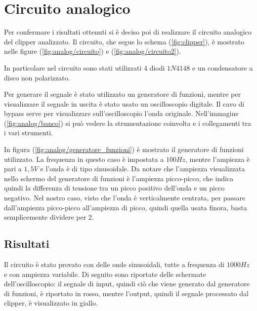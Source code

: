 \chapter{Circuito analogico}
	Per confermare i risultati ottenuti si è deciso poi di realizzare il circuito analogico del clipper analizzato. Il circuito, che segue lo schema (\ref{fig:clipper}), è mostrato nelle figure (\ref{fig:analog/circuito}) e (\ref{fig:analog/circuito2}).
	
	
	In particolare nel circuito sono stati utilizzati $4$ diodi $1N4148$ e un condensatore a disco non polarizzato.
	
	Per generare il segnale è stato utilizzato un generatore di funzioni, mentre per visualizzare il segnale in uscita è stato usato un oscilloscopio digitale. Il cavo di bypass serve per visualizzare sull'oscilloscopio l'onda originale. Nell'immagine (\ref{fig:analog/banco}) si può vedere la strumentazione coinvolta e i collegamenti tra i vari strumenti.
	
	In figura (\ref{fig:analog/generatore_funzioni}) è mostrato il generatore di funzioni utilizzato. La frequenza in questo caso è impostata a $100Hz$, mentre l'ampiezza è pari a $1,5V$ e l'onda è di tipo sinusoidale. Da notare che l'ampiezza visualizzata nello schermo del generatore di funzioni è l'ampiezza picco-picco, che indica quindi la differenza di tensione tra un picco positivo dell'onda e un picco negativo. Nel nostro caso, visto che l'onda è verticalmente centrata, per passare dall'ampiezza picco-picco all'ampiezza di picco, quindi quella usata finora, basta semplicemente dividere per $2$.
	
	
	\section{Risultati}
		Il circuito è stato provato con delle onde sinusoidali, tutte a frequenza di $1000Hz$ e con ampiezza variabile. Di seguito sono riportate delle schermate dell'oscilloscopio: il segnale di \textcolor{red!90!black}{input}, quindi ciò che viene generato dal generatore di funzioni, è riportato in \textcolor{red!90!black}{rosso}, mentre l'\textcolor{yellow!90!black}{output}, quindi il segnale processato dal clipper, è visualizzato in \textcolor{yellow!90!black}{giallo}.
				
		\pagebreak
		\vspace*{-30px}
		\pagebreak
